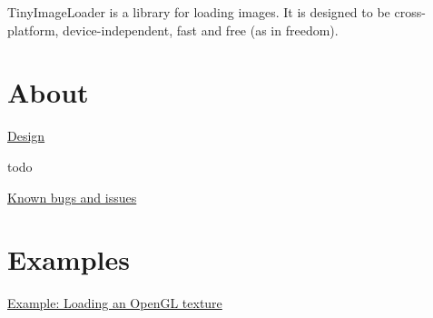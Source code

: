 TinyImageLoader is a library for loading images. It is designed to be cross-\/ platform, device-\/independent, fast and free (as in freedom).\hypertarget{index_About}{}\section{About}\label{index_About}

\begin{DoxyEnumerate}
\item \hyperlink{design}{Design}
\item todo
\item \hyperlink{bugs}{Known bugs and issues} 
\end{DoxyEnumerate}\hypertarget{index_Examples}{}\section{Examples}\label{index_Examples}

\begin{DoxyEnumerate}
\item \hyperlink{example1}{Example: Loading an OpenGL texture} 
\end{DoxyEnumerate}
